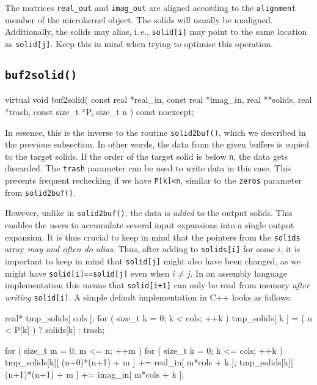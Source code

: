 \documentclass{scrbook}
\begin{document}
The matrices \lstinline|real_out| and \lstinline|imag_out| are aligned according
to the \lstinline|alignment| member of the microkernel object. The solids will
usually be unaligned. Additionally, the solids may alias, i.\,e.,
\lstinline|solid[i]| may point to the same location as \lstinline|solid[j]|.
Keep this in mind when trying to optimise this operation.

\subsection{\texorpdfstring{\lstinline|buf2solid()|}{buf2solid}}
\begin{cppcode*}
virtual void buf2solid( const real *real_in, const real *imag_in, 
                        real **solids, real *trash, const size_t *P, size_t n )
                        const noexcept;
\end{cppcode*}
In essence, this is the inverse to the routine \lstinline|solid2buf()|,
which we described in the previous subsection. In other words, the data from
the given buffers is copied to the target solids. If the order of the target
solid is below \lstinline|n|, the data gets discarded. The \lstinline|trash|
parameter can be used to write data in this case. This prevents frequent
rechecking if we have \lstinline|P[k]<n|, similar to the \lstinline|zeros|
parameter from \lstinline|solid2buf()|.

However, unlike in \lstinline|solid2buf()|, the data is \emph{added} to the
output solids. This enables the users to accumulate several input expansions
into a single output expansion. It is thus crucial to keep in mind that
the pointers from the \lstinline|solids| array \emph{may and often do alias}.
Thus, after adding to \lstinline|solids[i]| for some $i$, it is important to
keep in mind that \lstinline|solid[j]| might also have been changed, as we might
have \lstinline|solid[i]==solid[j]| even when $i\neq j$. In an assembly language
implementation this means that \lstinline|solid[i+1]| can only be read from
memory \emph{after writing} \lstinline|solid[i]|. A simple default
implementation in C++ looks as follows:
\begin{cppcode*}
real* tmp_solids[ cols ];
for ( size_t k = 0; k < cols; ++k )
    tmp_solids[ k ] = ( n < P[k] ) ? solids[k] : trash;

for ( size_t m = 0; m <= n;    ++m )
for ( size_t k = 0; k <= cols; ++k )
{
    tmp_solids[k][ (n+0)*(n+1) + m ] += real_in[ m*cols + k ];
    tmp_solids[k][ (n+1)*(n+1) + m ] += imag_in[ m*cols + k ];
}
\end{cppcode*}
\end{document}
